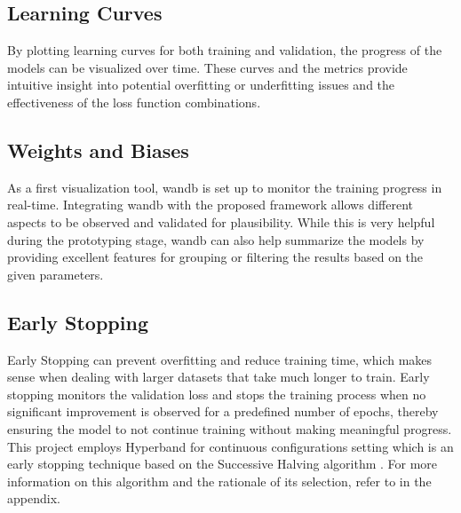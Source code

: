 \subsection{Learning Curves}
By plotting learning curves for both training and validation, the progress of the models can be visualized over time. These curves and the metrics provide intuitive insight into potential overfitting or underfitting issues and the effectiveness of the loss function combinations.

\subsection{Weights and Biases}
As a first visualization tool, \ac{wandb} is set up to monitor the training progress in real-time. Integrating \ac{wandb} with the proposed framework allows different aspects to be observed and validated for plausibility. While this is very helpful during the prototyping stage, \ac{wandb} can also help summarize the models by providing excellent features for grouping or filtering the results based on the given parameters.

\subsection{Early Stopping}
Early Stopping can prevent overfitting and reduce training time, which makes sense when dealing with larger datasets that take much longer to train. Early stopping monitors the validation loss and stops the training process when no significant improvement is observed for a predefined number of epochs, thereby ensuring the model to not continue training without making meaningful progress. This project employs Hyperband for continuous configurations setting which is an early stopping technique based on the Successive Halving algorithm \cite{https://doi.org/10.48550/arxiv.1603.06560}. For more information on this algorithm and the rationale of its selection, refer to  in the appendix.

